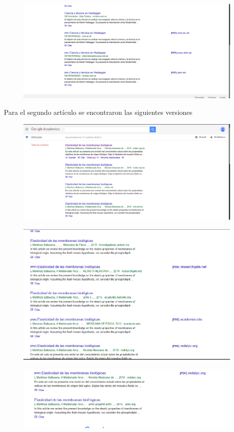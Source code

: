 \documentclass[12pt]{exam}
\begin{document}
\begin{figure}[H]
    \centering
    \includegraphics[width=0.8\linewidth]{heidegger versiones 2.png}
    \label{}
\end{figure}
Para el segundo artículo se encontraron las siguientes versiones
\begin{figure}[H]
    \centering
    \includegraphics[width=0.8\linewidth]{biofisica versiones.png}
    \label{}
\end{figure}
\begin{figure}[H]
    \centering
    \includegraphics[width=0.8\linewidth]{biofisica versiones 2.png}
    \label{}
\end{figure}
\begin{figure}[H]
    \centering
    \includegraphics[width=0.8\linewidth]{biofisica versiones 3.png}
    \label{}
\end{figure}
\end{document}
